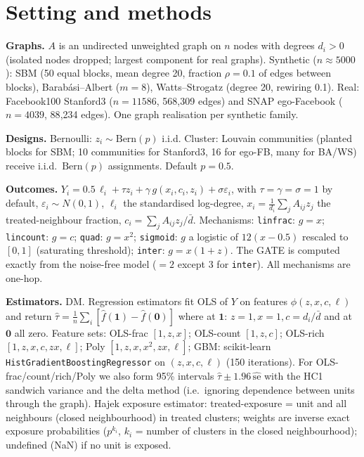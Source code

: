 \documentclass{article}
\begin{document}
\section{Setting and methods}
\textbf{Graphs.} $A$ is an undirected unweighted graph on $n$ nodes with degrees $d_i>0$ (isolated nodes dropped; largest component for real graphs). Synthetic ($n{\approx}5000$): SBM (50 equal blocks, mean degree 20, fraction $\rho=0.1$ of edges between blocks), Barab\'asi--Albert ($m=8$), Watts--Strogatz (degree 20, rewiring 0.1). Real: Facebook100 Stanford3 \citep{traud2012,rossi2015} ($n=11586$, 568{,}309 edges) and SNAP ego-Facebook \citep{mcauley2012} ($n=4039$, 88{,}234 edges). One graph realisation per synthetic family.

\textbf{Designs.} Bernoulli: $z_i\sim\mathrm{Bern}(p)$ i.i.d. Cluster: Louvain communities (planted blocks for SBM; 10 communities for Stanford3, 16 for ego-FB, many for BA/WS) receive i.i.d.\ $\mathrm{Bern}(p)$ assignments. Default $p=0.5$.

\textbf{Outcomes.} $Y_i=0.5\,\ell_i+\tau z_i+\gamma\,g(x_i,c_i,z_i)+\sigma\varepsilon_i$, with $\tau=\gamma=\sigma=1$ by default, $\varepsilon_i\sim N(0,1)$, $\ell_i$ the standardised log-degree, $x_i=\frac1{d_i}\sum_jA_{ij}z_j$ the treated-neighbour fraction, $c_i=\sum_jA_{ij}z_j/\bar d$. Mechanisms: \texttt{linfrac}: $g=x$; \texttt{lincount}: $g=c$; \texttt{quad}: $g=x^2$; \texttt{sigmoid}: $g$ a logistic of $12(x-0.5)$ rescaled to $[0,1]$ (saturating threshold); \texttt{inter}: $g=x(1+z)$. The GATE is computed exactly from the noise-free model ($=2$ except $3$ for \texttt{inter}). All mechanisms are one-hop.

\textbf{Estimators.} DM. Regression estimators fit OLS of $Y$ on features $\phi(z,x,c,\ell)$ and return $\hat\tau=\frac1n\sum_i[\hat f(\mathbf 1)-\hat f(\mathbf 0)]$ where at $\mathbf 1$: $z=1,x=1,c=d_i/\bar d$ and at $\mathbf 0$ all zero. Feature sets: OLS-frac $[1,z,x]$; OLS-count $[1,z,c]$; OLS-rich $[1,z,x,c,zx,\ell]$; Poly $[1,z,x,x^2,zx,\ell]$; GBM: scikit-learn \texttt{HistGradientBoostingRegressor} on $(z,x,c,\ell)$ (150 iterations). For OLS-frac/count/rich/Poly we also form 95\% intervals $\hat\tau\pm1.96\,\widehat{\mathrm{se}}$ with the HC1 sandwich variance and the delta method (i.e.\ ignoring dependence between units through the graph). Hajek exposure estimator: treated-exposure = unit and all neighbours (closed neighbourhood) in treated clusters; weights are inverse exact exposure probabilities ($p^{k_i}$, $k_i$ = number of clusters in the closed neighbourhood); undefined (NaN) if no unit is exposed.
\end{document}
